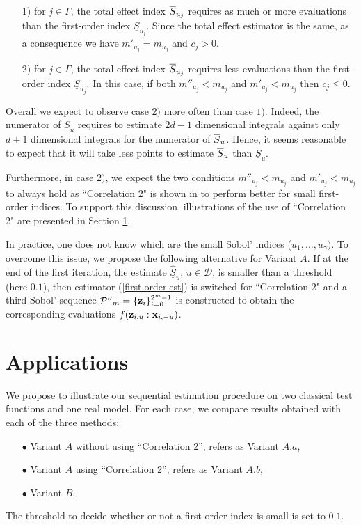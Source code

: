 \begin{itemize}
\item[1)] for $j \in \Gamma$, the total effect index $\ov{$S$}_{u_j}$ requires as much or more evaluations than the first-order index $\underline{S}_{u_j}$. Since the total effect estimator is the same, as a consequence we have $m'_{u_j}=m_{u_j}$ and $c_j >0$.
\item[2)] for $j \in \Gamma$, the total effect index $\ov{$S$}_{u_j}$ requires less evaluations than the first-order index $\underline{S}_{u_j}$. In this case, if both $m''_{u_j} < m_{u_j}$ and $m'_{u_j} < m_{u_j}$ then $c_j \leq 0$.  
\end{itemize}
Overall we expect to observe case $2)$ more often than case $1)$. Indeed, the numerator of $\underline{S}_u$ requires to estimate $2d-1$ dimensional integrals against only $d+1$ dimensional integrals for the numerator of $\ov{$S$}_u$. Hence, it seems reasonable to expect that it will take less points to estimate $\ov{$S$}_u$ than $\underline{S}_u$. 

Furthermore, in case $2)$, we expect the two conditions $m''_{u_j} < m_{u_j}$ and $m'_{u_j} < m_{u_j}$ to always hold as ``Correlation 2" is shown in \cite{Owen} to perform better for small first-order indices. To support this discussion, illustrations of the use of ``Correlation 2" are presented in Section \ref{sec:5}. 

In practice, one does not know which are the small Sobol' indices ($u_1,\dots,u_\gamma)$. To overcome this issue, we propose the following alternative for Variant $A$. If at the end of the first iteration, the estimate $\widehat{\underline{S}}_u$, $u \in \mathcal{D}$, is smaller than a threshold (here $0.1$), then estimator (\ref{first.order.est}) is switched for ``Correlation 2" and a third Sobol' sequence $\mathcal{P''}_{m}=\{\boldsymbol{\mathbf{z}}_i\}_{i=0}^{2^m-1}$ is constructed to obtain the corresponding evaluations $f({\boldsymbol{\mathbf{z}}}_{i,u}:{\boldsymbol{\mathbf{x}}}_{i,-u})$.

\section{Applications}
\label{sec:5}

We propose to illustrate our sequential estimation procedure on two classical test functions and one real model. For each case, we compare results obtained with each of the three methods:
\begin{itemize}
\item[$\bullet$] Variant $A$ without using ``Correlation 2'', refers as Variant $A.a$, 
\item[$\bullet$] Variant $A$ using ``Correlation 2'', refers as Variant $A.b$,
\item[$\bullet$] Variant $B$.
\end{itemize}
The threshold to decide whether or not a first-order index is small is set to $0.1$.

